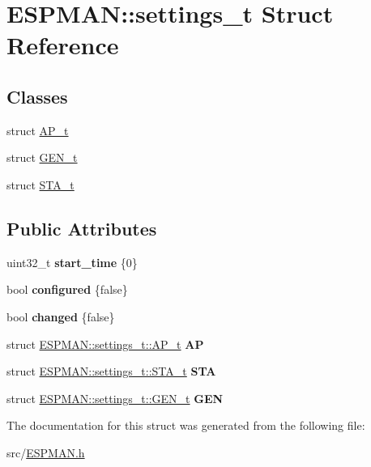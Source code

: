 \hypertarget{struct_e_s_p_m_a_n_1_1settings__t}{}\section{E\+S\+P\+M\+AN\+:\+:settings\+\_\+t Struct Reference}
\label{struct_e_s_p_m_a_n_1_1settings__t}
\subsection*{Classes}
\begin{DoxyCompactItemize}
\item 
struct \hyperlink{struct_e_s_p_m_a_n_1_1settings__t_1_1_a_p__t}{A\+P\+\_\+t}
\item 
struct \hyperlink{struct_e_s_p_m_a_n_1_1settings__t_1_1_g_e_n__t}{G\+E\+N\+\_\+t}
\item 
struct \hyperlink{struct_e_s_p_m_a_n_1_1settings__t_1_1_s_t_a__t}{S\+T\+A\+\_\+t}
\end{DoxyCompactItemize}
\subsection*{Public Attributes}
\begin{DoxyCompactItemize}
\item 
\mbox{\label{struct_e_s_p_m_a_n_1_1settings__t_afdfbe5e2138f651b5331ba75280dbc0d}} 
uint32\+\_\+t {\bfseries start\+\_\+time} \{0\}
\item 
\mbox{\label{struct_e_s_p_m_a_n_1_1settings__t_a62838fac4146714011ede8f41437dec3}} 
bool {\bfseries configured} \{false\}
\item 
\mbox{\label{struct_e_s_p_m_a_n_1_1settings__t_ae4f94725baa4ef750e25da497c5a1e1e}} 
bool {\bfseries changed} \{false\}
\item 
\mbox{\label{struct_e_s_p_m_a_n_1_1settings__t_aa89be6706c844d02a89be015f544f439}} 
struct \hyperlink{struct_e_s_p_m_a_n_1_1settings__t_1_1_a_p__t}{E\+S\+P\+M\+A\+N\+::settings\+\_\+t\+::\+A\+P\+\_\+t} {\bfseries AP}
\item 
\mbox{\label{struct_e_s_p_m_a_n_1_1settings__t_aa612b5cad39f6d7978e25de947dc9b8e}} 
struct \hyperlink{struct_e_s_p_m_a_n_1_1settings__t_1_1_s_t_a__t}{E\+S\+P\+M\+A\+N\+::settings\+\_\+t\+::\+S\+T\+A\+\_\+t} {\bfseries S\+TA}
\item 
\mbox{\label{struct_e_s_p_m_a_n_1_1settings__t_abf8d25d5369c83792a31bc4e8b8ca9d5}} 
struct \hyperlink{struct_e_s_p_m_a_n_1_1settings__t_1_1_g_e_n__t}{E\+S\+P\+M\+A\+N\+::settings\+\_\+t\+::\+G\+E\+N\+\_\+t} {\bfseries G\+EN}
\end{DoxyCompactItemize}


The documentation for this struct was generated from the following file\+:\begin{DoxyCompactItemize}
\item 
src/\hyperlink{_e_s_p_m_a_n_8h}{E\+S\+P\+M\+A\+N.\+h}\end{DoxyCompactItemize}
